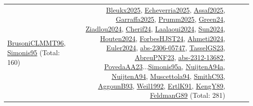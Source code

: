 {\begin{longtable}{p{3cm}r>{\raggedright\arraybackslash}p{6cm}>{\raggedright\arraybackslash}p{6cm}>{\raggedright\arraybackslash}p{8cm}}
\hyperref[detail:BrusoniCLMMT96]{BrusoniCLMMT96}, \hyperref[detail:Simonis95]{Simonis95} (Total: 160) & \hyperref[detail:Bleukx2025]{Bleukx2025}, \hyperref[detail:Echeverria2025]{Echeverria2025}, \hyperref[detail:Assaf2025]{Assaf2025}, \hyperref[detail:Garraffa2025]{Garraffa2025}, \hyperref[detail:Prumm2025]{Prumm2025}, \hyperref[detail:Green24]{Green24}, \hyperref[detail:Ziadlou2024]{Ziadlou2024}, \hyperref[detail:Cherif24]{Cherif24}, \hyperref[detail:Laalaoui2024]{Laalaoui2024}, \hyperref[detail:Sun2024]{Sun2024}, \hyperref[detail:Houten2024]{Houten2024}, \hyperref[detail:ForbesHJST24]{ForbesHJST24}, \hyperref[detail:Ahmeti2024]{Ahmeti2024}, \hyperref[detail:Euler2024]{Euler2024}, \hyperref[detail:abs-2306-05747]{abs-2306-05747}, \hyperref[detail:TasselGS23]{TasselGS23}, \hyperref[detail:AbreuPNF23]{AbreuPNF23}, \hyperref[detail:abs-2312-13682]{abs-2312-13682}, \hyperref[detail:PovedaAA23]{PovedaAA23}...\hyperref[detail:Simonis95a]{Simonis95a}, \hyperref[detail:NuijtenA94a]{NuijtenA94a}, \hyperref[detail:NuijtenA94]{NuijtenA94}, \hyperref[detail:Muscettola94]{Muscettola94}, \hyperref[detail:SmithC93]{SmithC93}, \hyperref[detail:AggounB93]{AggounB93}, \hyperref[detail:Weil1992]{Weil1992}, \hyperref[detail:ErtlK91]{ErtlK91}, \hyperref[detail:KengY89]{KengY89}, \hyperref[detail:FeldmanG89]{FeldmanG89} (Total: 281)\\
\end{longtable}
}

\clearpage
